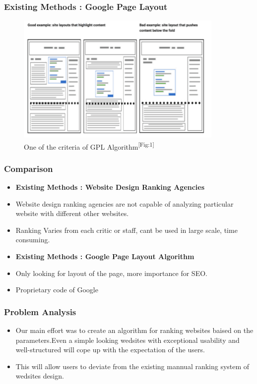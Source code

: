 \documentclass[11pt]{beamer}
\begin{document}
	\begin{frame}
	\frametitle{{Existing Methods : Google Page Layout}}
		\begin{figure}
		
		\includegraphics[width=10cm]{image/gpa.png}
		\caption{One of the criteria of GPL Algorithm\textsuperscript{[Fig:1]}}
		\label{fig1:gpa}
	\end{figure}
	\end{frame}
\begin{frame}
			\frametitle{{Comparison}}
	\begin{itemize}

		\item \textbf{Existing Methods : Website Design Ranking Agencies}
		\item Website design ranking agencies are not capable of analyzing particular website with different other websites.
		\item Ranking Varies from each critic or staff, cant be used in large scale, time consuming.
		\item \textbf{Existing Methods : Google Page Layout Algorithm}
		\item Only looking for layout of the page, more importance for SEO.
		\item Proprietary code of Google

	\end{itemize}
\end{frame}

\begin{frame}
\frametitle{{Problem Analysis}}
\begin{itemize}
	\item Our main effort was to create an algorithm for ranking websites baised on the parameters.Even a simple looking wedsites with exceptional usability and well-structured will cope up with the expectation of the users.
	
	\item This will allow users to deviate from the existing mannual ranking system of wedsites design.
\end{itemize}
\end{frame}
\end{document}
